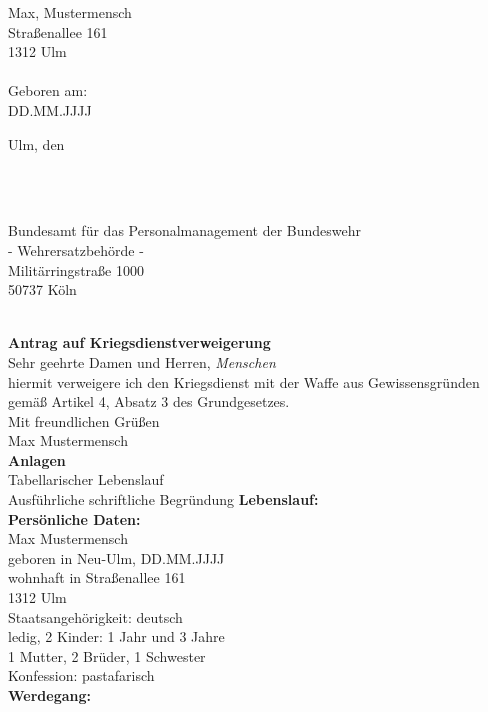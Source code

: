 \documentclass[12pt]{article}
\date{\today}
\newcommand{\Vorname}{Max}
\newcommand{\Nachname}{Mustermensch}
\newcommand{\Strasse}{Straßenallee}
\newcommand{\Hausnummer}{161}
\newcommand{\Postleitzahl}{1312}
\newcommand{\Wohnort}{Ulm}
\newcommand{\Ort}{Ulm}
\newcommand{\Geburtsdatum}{DD.MM.JJJJ}
\newcommand{\Geburtsort}{Neu-Ulm}
\newcommand{\Staatsangehorigkeit}{deutsch}
\newcommand{\Familienstand}{ledig}
\newcommand{\Kinder}{2 Kinder: 1 Jahr und 3 Jahre} %
\newcommand{\Eltern}{1 Mutter} %
\newcommand{\Geschwister}{2 Brüder, 1 Schwester}
\newcommand{\Konfession}{pastafarisch} %
\begin{document}
\noindent
\begin{minipage}[t]{4cm}
\Vorname, \Nachname \\
\Strasse{} \Hausnummer \\ 
\Postleitzahl{} \Wohnort \\ 
\\ 
Geboren am: \\
\Geburtsdatum
\end{minipage} \hfill 
\begin{minipage}[t]{4cm}
    \Ort, den \ddmmyyyydate{\today}
\end{minipage}\\ 
\\[3cm]
\begin{minipage}[t]{15cm}
Bundesamt für das Personalmanagement der Bundeswehr\\
- Wehrersatzbehörde -\\
Militärringstraße 1000\\
50737 Köln
\end{minipage}
\\[3cm]
\textbf{Antrag auf Kriegsdienstverweigerung}
\\[1cm]
Sehr geehrte Damen und Herren, \textit{Menschen} \\[0.25cm] 
hiermit verweigere ich den Kriegsdienst mit der Waffe aus Gewissensgründen gemäß Artikel 4, Absatz 3 des Grundgesetzes.
\\[2cm]
Mit freundlichen Grüßen\\
\Vorname{} \Nachname\\ 
\vfill
\noindent
\textbf{Anlagen}\\
Tabellarischer Lebenslauf\\ 
Ausführliche schriftliche Begründung
\newpage 
\noindent
{\Large \textbf{Lebenslauf:}}\\[2cm]
\textbf{Persönliche Daten:}\\[1cm]
\Vorname{} \Nachname\\
geboren in \Geburtsort, \Geburtsdatum\\ 
wohnhaft in \Strasse{} \Hausnummer\\ 
\Postleitzahl{} \Wohnort\\
Staatsangehörigkeit: \Staatsangehorigkeit\\ 
\Familienstand, \Kinder\\
\Eltern, \Geschwister\\
Konfession: \Konfession\\[2cm]
\textbf{Werdegang:}\\[1cm]
\end{document}
